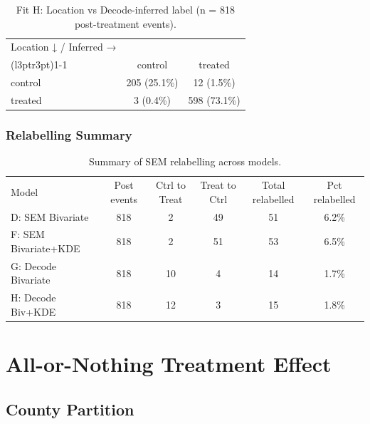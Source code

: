 \documentclass[
]{article}
\begin{document}
\begin{longtable}[t]{lcc}

\caption{\label{tbl-cm-H}Fit H: Location vs Decode-inferred label (n =
818 post-treatment events).}

\tabularnewline

\\
\toprule
\multicolumn{1}{c}{Location ↓ / Inferred →} & \multicolumn{2}{c}{ } \\
\cmidrule(l{3pt}r{3pt}){1-1}
 & control & treated\\
\midrule
control & 205  (25.1\%) & 12  (1.5\%)\\
treated & 3  (0.4\%) & 598  (73.1\%)\\
\bottomrule

\end{longtable}

\subsubsection{Relabelling Summary}\label{relabelling-summary}

\begin{longtable}[t]{lccccc}

\caption{\label{tbl-cm-summary}Summary of SEM relabelling across
models.}

\tabularnewline

\\
\toprule
Model & Post events & Ctrl to Treat & Treat to Ctrl & Total relabelled & Pct relabelled\\
\midrule
D: SEM Bivariate & 818 & 2 & 49 & 51 & 6.2\%\\
F: SEM Bivariate+KDE & 818 & 2 & 51 & 53 & 6.5\%\\
G: Decode Bivariate & 818 & 10 & 4 & 14 & 1.7\%\\
H: Decode Biv+KDE & 818 & 12 & 3 & 15 & 1.8\%\\
\bottomrule

\end{longtable}

\section{All-or-Nothing Treatment
Effect}\label{all-or-nothing-treatment-effect}

\subsection{County Partition}\label{county-partition-1}
\end{document}
